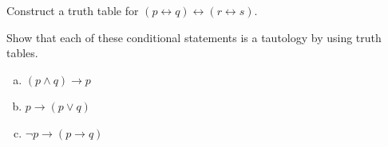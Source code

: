 Construct a truth table for $(p\leftrightarrow q) \leftrightarrow (r \leftrightarrow s)$.

{}%
Show that each of these conditional statements is a tautology by using truth tables.
\begin{enumerate}[(a)]
\item $(p\land q)\to p$
\item $p\to(p\lor q)$
\item $\neg p\to(p\to q)$
\end{enumerate}



